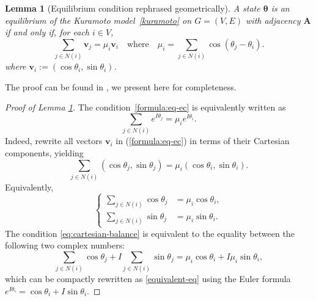 \documentclass[11pt,reqno]{amsart}
\newtheorem{lemma}[theorem]{Lemma}
\theoremstyle{definition}
\begin{document}
\begin{lemma}[Equilibrium condition rephrased geometrically]\label{eq-vec}
A state \( \boldsymbol{\theta} \) is an equilibrium of the Kuramoto model~\eqref{kuramoto} on $G=(V,E)$ with adjacency $\boldsymbol{A}$ {if and only if}, for each \( i \in V \), %
\begin{equation}\label{formula:eq-ec}
\sum_{j\in N(i)} \boldsymbol{v}_j = \mu_i \boldsymbol{v}_i\quad\text{where}\quad \mu_i=\sum_{j\in N(i)}\cos(\theta_j-\theta_i).
\end{equation} where $\boldsymbol v_i:=(\cos\theta_i,\sin\theta_i)$.
\end{lemma}
The proof can be found in \cite{monzon2005global}, we present here for completeness.
\begin{proof}[Proof of Lemma \ref{eq-vec}]
The condition~\eqref{formula:eq-ec} is equivalently written as
\begin{equation}\label{equivalent-eq}
    \sum_{j\in N(i)} e^{I\theta_j} = \mu_i e^{I\theta_i}.
\end{equation}
Indeed, rewrite all vectors \( \boldsymbol{v}_i \) in (\ref{formula:eq-ec}) in terms of their Cartesian components, yielding  
\[ \sum_{j\in N(i)} (\cos\theta_j,\sin\theta_j) = \mu_i(\cos\theta_i,\sin\theta_i). \]  
Equivalently,
\begin{equation}\label{eq:cartesian-balance}
\left\{
\begin{aligned}
    \sum_{j\in N(i)}\cos\theta_j &= \mu_i\cos\theta_i, \\
    \sum_{j\in N(i)}\sin\theta_j &= \mu_i\sin\theta_i.
\end{aligned}
\right.
\end{equation}  
The condition \eqref{eq:cartesian-balance} is equivalent to the equality between the following two complex numbers:  
\[
\sum_{j\in N(i)} \cos\theta_j + I\sum_{j\in N(i)}\sin\theta_j = \mu_i\cos\theta_i + I \mu_i \sin\theta_i,
\]  
which can be compactly rewritten as \eqref{equivalent-eq} using the Euler formula $e^{I\theta_i}=\cos\theta_i+I\sin\theta_i$.


\end{proof}
\end{document}
